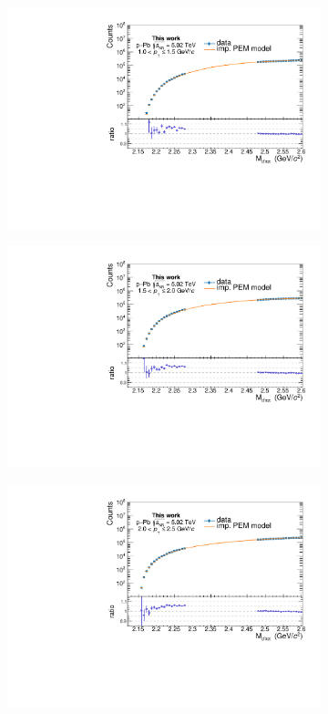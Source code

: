 \begin{appendices}
\begin{figure}[!h]
\begin{subfigure}{.5\textwidth}
  \includegraphics[width=\linewidth]{gfx/appendix/impem/can_blindPEMimp2}
  \caption{}
\end{subfigure}%
\begin{subfigure}{.5\textwidth}
  \centering
  \captionsetup{justification=centering}
  \includegraphics[width=\linewidth]{gfx/appendix/impem/can_blindPEMimp3}
  \caption{}
\end{subfigure}
\begin{subfigure}{.5\textwidth}
  \centering
  \captionsetup{justification=centering}
  \includegraphics[width=\linewidth]{gfx/appendix/impem/can_blindPEMimp4}

\end{subfigure}
\end{figure}
\end{appendices}
